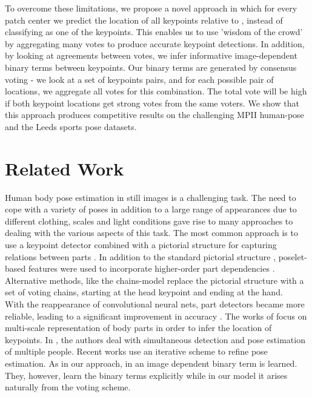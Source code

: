 \documentclass{article}
\begin{document}
To overcome these limitations, we propose a novel approach in which for every patch center  we predict the location of all keypoints relative to , instead of classifying  as one of the keypoints. This enables us to use 'wisdom of the crowd' by aggregating many votes to produce accurate keypoint detections. In addition, by looking at agreements between votes, we infer informative image-dependent binary terms between keypoints. Our binary terms are generated by consensus voting - we look at a set of keypoints pairs, and for each possible  pair of locations, we aggregate all votes for this combination. The total vote will be high if both keypoint locations get strong votes from the same voters. We show that this approach produces competitive results on the challenging MPII human-pose  \cite{pishchulin13} and the Leeds sports pose \cite{Johnson10} datasets.



\section{Related Work}
Human body pose estimation in still images is a challenging task. The need to cope with a variety of poses in addition to a large range of appearances due to different clothing, scales and light conditions gave rise to many approaches to dealing with the various aspects of this task. The most common approach is to use a keypoint detector combined with a pictorial structure  for capturing relations between parts \cite{felzenszwalb05,yang11}. In addition to the standard pictorial structure \cite{fischler73}, poselet-based features were used to incorporate higher-order part dependencies \cite{pishchulin13}. Alternative methods, like the chains-model  \cite{karlinsky10} replace the pictorial structure with a set of voting chains, starting at the head keypoint and ending at the hand.\\


With the reappearance of convolutional neural nets, part detectors became more reliable, leading to a significant improvement in accuracy  \cite{chen14,Tompson14,carreira15,Tompson15,pishchulin15,wei16}. The works of \cite{Tompson14,Tompson15} focus on multi-scale representation of body parts in order to infer the location of keypoints. In \cite{pishchulin15}, the authors deal with simultaneous detection and pose estimation of multiple people. Recent works \cite{carreira15,wei16} use an iterative scheme to refine pose estimation. As in our approach, in \cite{chen14} an image dependent binary term is  learned. They, however, learn the binary terms explicitly while in our model it arises naturally from the voting scheme.
\end{document}
